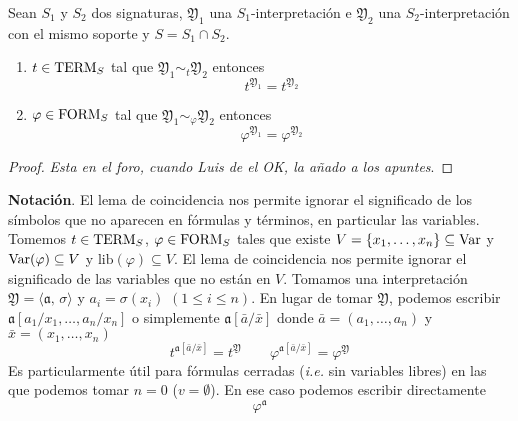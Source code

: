 \begin{theorem}
Sean $S_1$ y $S_2$ dos signaturas, $\mathfrak{Y}_1$ una $S_1$-interpretación e $\mathfrak{Y}_2$ una $S_2$-interpretación con el mismo soporte y $S=S_1 \cap S_2$. 
\begin{enumerate}
	\item $t \in \mbox{TERM}_{S}$ tal que $\mathfrak{Y}_1 \sim_{t} \mathfrak{Y}_2$ entonces 
	\[ t^{\mathfrak{Y}_1}=t^{\mathfrak{Y}_2} \]
	\item $\varphi \in \mbox{FORM}_{S}$ tal que $\mathfrak{Y}_1 \sim_{\varphi} \mathfrak{Y}_2$ entonces 
	\[ \varphi^{\mathfrak{Y}_1}=\varphi^{\mathfrak{Y}_2} \]
\end{enumerate}
\end{theorem}
\begin{proof}
{\color{blue}\textit{Esta en el foro, cuando Luis de el OK, la añado a los apuntes}.}
\end{proof}

\textbf{Notación}. El lema de coincidencia nos permite ignorar el significado de los símbolos que no aparecen en fórmulas y términos, en particular las variables. Tomemos $t \in \mbox{TERM}_{S}$, $\varphi \in \mbox{FORM}_{S}$ tales que existe $V=\{ x_1, \ldots, x_n \} \subseteq \mbox{Var}$ y $\mbox{Var}(\varphi)\subseteq V$ y $\mbox{lib}(\varphi) \subseteq V$. El lema de coincidencia nos permite ignorar el significado de las variables que no están en $V$. Tomamos una interpretación $\mathfrak{Y}=\langle \mathfrak{a}, \, \sigma \rangle$ y $a_i= \sigma(x_i)$ $(1 \leq i \leq n)$. En lugar de tomar $\mathfrak{Y}$, podemos escribir $\mathfrak{a}[a_1/x_1, \ldots, a_n/x_n]$ o simplemente $\mathfrak{a}[\bar{a}/\bar{x}]$ donde $\bar{a}=(a_1, \ldots, a_n)$ y $\bar{x}=(x_1, \ldots, x_n)$
\[ t^{\mathfrak{a}[\bar{a}/\bar{x}]}=t^{\mathfrak{Y}} \qquad \varphi^{\mathfrak{a}[\bar{a}/\bar{x}]}=\varphi^{\mathfrak{Y}} \]
Es particularmente útil para fórmulas cerradas (\textit{i.e.} sin variables libres) en las que podemos tomar $n=0$ ($v=\emptyset$). En ese caso podemos escribir directamente 
\[ \varphi^{\mathfrak{a}} \]
  